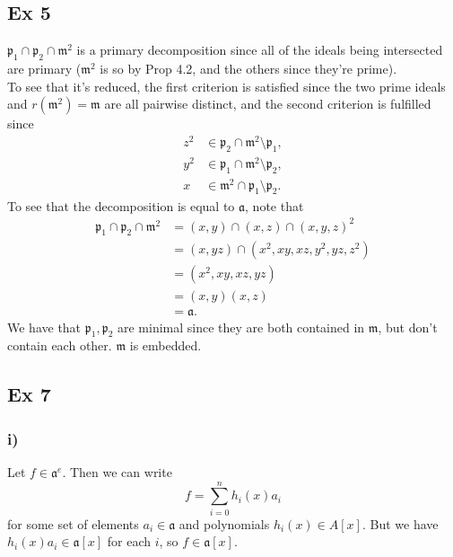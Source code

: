 \documentclass{article}
\theoremstyle{definition}
\begin{document}
\subsection*{Ex 5}

$\mathfrak{p}_1 \cap \mathfrak{p}_2 \cap \mathfrak{m}^{2}$ is a primary
decomposition since all of the ideals being intersected are primary
($\mathfrak{m}^{2}$ is so by Prop 4.2, and the others since they're prime). \\

To see that it's reduced, the first criterion is satisfied since the two prime
ideals and $r(\mathfrak{m}^{2}) = \mathfrak{m}$ are all pairwise distinct, and 
the second criterion is fulfilled since
\begin{align*}
	z^{2} &\in \mathfrak{p}_2 \cap \mathfrak{m}^{2} \setminus \mathfrak{p}_1, \\
	y^{2} &\in \mathfrak{p}_1 \cap \mathfrak{m}^{2} \setminus \mathfrak{p}_2, \\
	x &\in \mathfrak{m}^{2} \cap \mathfrak{p}_{1} \setminus \mathfrak{p}_2.
\end{align*}
To see that the decomposition is equal to $\mathfrak{a}$, note that 
\begin{align*}
	\mathfrak{p}_1 \cap \mathfrak{p}_2 \cap \mathfrak{m}^{2}
	&=
	(x, y) \cap (x, z) \cap (x, y, z)^{2} \\
	&=
	(x, yz) \cap (x^{2}, xy, xz, y^{2}, yz, z^{2}) \\
	&=
	(x^{2}, xy, xz, yz) \\
	&=
	(x, y) (x, z) \\
	&=
	\mathfrak{a}.
\end{align*} 
We have that $\mathfrak{p_1}, \mathfrak{p_2}$ are minimal since they are both
contained in $\mathfrak{m}$, but don't contain each other. $\mathfrak{m}$ is
embedded. \\

\subsection*{Ex 7}
\subsubsection*{i)}

Let $f \in \mathfrak{a}^{e}$. Then we can write 
\[
	f = \sum_{i = 0}^{n} h_i(x) a_i
\] 
for some set of elements $a_i \in \mathfrak{a}$ and polynomials $h_i(x) \in
A[x]$. But we have $h_i(x) a_i \in \mathfrak{a}[x]$ for each $i$, so 
$f \in \mathfrak{a}[x]$. \\
\end{document}

